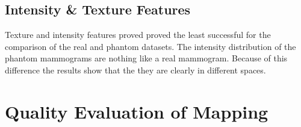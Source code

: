 \subsection{Intensity \& Texture Features}
Texture and intensity features proved proved the least successful for the comparison of the real and phantom datasets. The intensity distribution of the phantom mammograms are nothing like a real mammogram. Because of this difference the results show that the they are clearly in different spaces.

\label{subsec:results-texture}

\section{Quality Evaluation of Mapping}